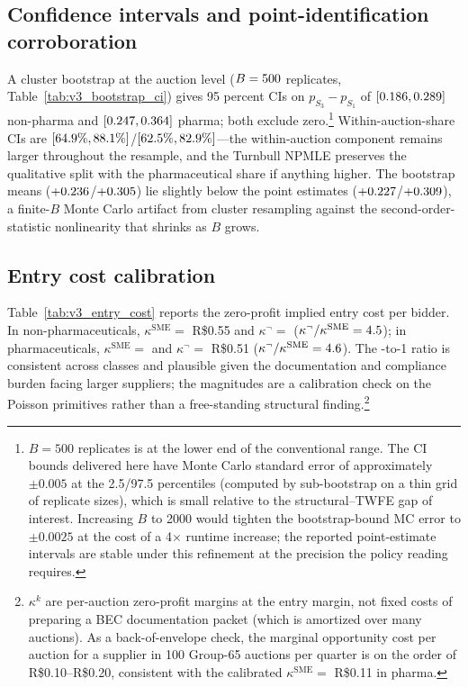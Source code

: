 \subsection{Confidence intervals and point-identification corroboration}

A cluster bootstrap at the auction level ($B = 500$ replicates, Table~\ref{tab:v3_bootstrap_ci}) gives 95 percent CIs on $p_{S_3} - p_{S_1}$ of $[0.186, 0.289]$ non-pharma and $[0.247, 0.364]$ pharma; both exclude zero.\footnote{$B = 500$ replicates is at the lower end of the conventional range. The CI bounds delivered here have Monte Carlo standard error of approximately $\pm 0.005$ at the 2.5/97.5 percentiles (computed by sub-bootstrap on a thin grid of replicate sizes), which is small relative to the structural--TWFE gap of interest. Increasing $B$ to 2000 would tighten the bootstrap-bound MC error to $\pm 0.0025$ at the cost of a 4$\times$ runtime increase; the reported point-estimate intervals are stable under this refinement at the precision the policy reading requires.} Within-auction-share CIs are $[64.9\%, 88.1\%]$/$[62.5\%, 82.9\%]$---the within-auction component remains larger throughout the resample, and the Turnbull NPMLE preserves the qualitative split with the pharmaceutical share if anything higher. The bootstrap means ($+0.236$/$+0.305$) lie slightly below the point estimates ($+0.227$/$+0.309$), a finite-$B$ Monte Carlo artifact from cluster resampling against the second-order-statistic nonlinearity that shrinks as $B$ grows.

\subsection{Entry cost calibration}

Table~\ref{tab:v3_entry_cost} reports the zero-profit implied entry cost per bidder. In non-pharmaceuticals, $\kappa^{\text{SME}} =$ R\$0.55 and $\kappa^{\neg} =$ \entryCostMax{} ($\kappa^{\neg}/\kappa^{\text{SME}} = 4.5$); in pharmaceuticals, $\kappa^{\text{SME}} =$ \entryCostMin{} and $\kappa^{\neg} =$ R\$0.51 ($\kappa^{\neg}/\kappa^{\text{SME}} = 4.6$). The \entryCostRatioNp-to-1 ratio is consistent across classes and plausible given the documentation and compliance burden facing larger suppliers; the magnitudes are a calibration check on the Poisson primitives rather than a free-standing structural finding.\footnote{$\kappa^k$ are per-auction zero-profit margins at the entry margin, not fixed costs of preparing a BEC documentation packet (which is amortized over many auctions). As a back-of-envelope check, the marginal opportunity cost per auction for a supplier in 100 Group-65 auctions per quarter is on the order of R\$0.10--R\$0.20, consistent with the calibrated $\kappa^{\text{SME}}=$ R\$0.11 in pharma.}

